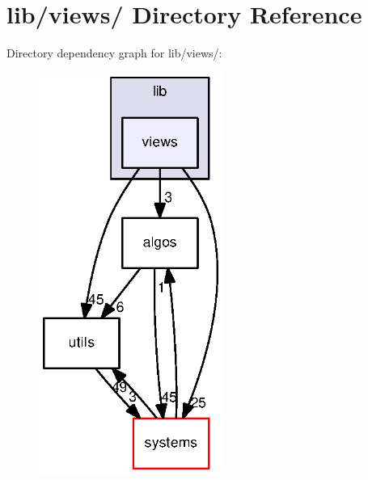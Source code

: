 \section{lib/views/ \-Directory \-Reference}
\label{dir_d2ada1a8c4e3ac8eca80b82469fcadff}
\-Directory dependency graph for lib/views/\-:
\nopagebreak
\begin{figure}[H]
\begin{center}
\leavevmode
\includegraphics[width=170pt]{dir_d2ada1a8c4e3ac8eca80b82469fcadff_dep}
\end{center}
\end{figure}
